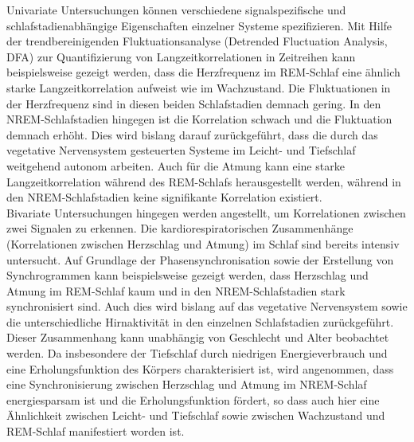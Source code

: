 Univariate Untersuchungen können verschiedene signalspezifische und schlafstadienabhängige Eigenschaften einzelner Systeme spezifizieren. Mit Hilfe der trendbereinigenden Fluktuationsanalyse (Detrended Fluctuation Analysis, DFA) zur Quantifizierung von Langzeitkorrelationen in Zeitreihen kann beispielsweise gezeigt werden, dass die Herzfrequenz im \acs{REM}-Schlaf eine ähnlich starke Langzeitkorrelation aufweist wie im Wachzustand. Die Fluktuationen in der Herzfrequenz sind in diesen beiden Schlafstadien demnach gering. In den \acs{NREM}-Schlafstadien hingegen ist die Korrelation schwach und die Fluktuation demnach erhöht. Dies wird bislang darauf zurückgeführt, dass die durch das vegetative Nervensystem gesteuerten Systeme im Leicht- und Tiefschlaf weitgehend autonom arbeiten. Auch für die Atmung kann eine starke Langzeitkorrelation während des \acs{REM}-Schlafs herausgestellt werden, während in den \acs{NREM}-Schlafstadien keine signifikante Korrelation existiert. \parencite{penzel_cardiovascular_2007}\\

Bivariate Untersuchungen hingegen werden angestellt, um Korrelationen zwischen zwei Signalen zu erkennen. Die kardiorespiratorischen Zusammenhänge (Korrelationen zwischen Herzschlag und Atmung) im Schlaf sind bereits intensiv untersucht. Auf Grundlage der Phasensynchronisation sowie der Erstellung von Synchrogrammen kann beispielsweise gezeigt werden, dass Herzschlag und Atmung im \acs{REM}-Schlaf kaum und in den \acs{NREM}-Schlafstadien stark synchronisiert sind. Auch dies wird bislang auf das vegetative Nervensystem sowie die unterschiedliche Hirnaktivität in den einzelnen Schlafstadien zurückgeführt. Dieser Zusammenhang kann unabhängig von Geschlecht und Alter beobachtet werden. Da insbesondere der Tiefschlaf durch niedrigen Energieverbrauch und eine Erholungsfunktion des Körpers charakterisiert ist, wird angenommen, dass eine Synchronisierung zwischen Herzschlag und Atmung im \acs{NREM}-Schlaf energiesparsam ist und die Erholungsfunktion fördert, so dass auch hier eine Ähnlichkeit zwischen Leicht- und Tiefschlaf sowie zwischen Wachzustand und \acs{REM}-Schlaf manifestiert worden ist. \parencite{penzel_cardiovascular_2007, hamann_automated_2009, bartsch_experimental_2007}\\


